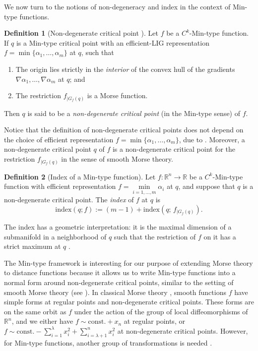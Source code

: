 \documentclass[11pt]{article}
\newcommand{\R}{\mathbb{R}}
\newcommand{\idx}{\mathrm{index}}
\newcommand{\grad}{\nabla}
\theoremstyle{plain}
\theoremstyle{definition}
\newtheorem{defi}{Definition}
\theoremstyle{remark}
\begin{document}
We now turn to the notions of non-degeneracy and index in the context of Min-type functions. 
	
\begin{defi}[Non-degenerate critical point \citep{gershkovich_morse_1997}]
	\label{def:non_degen_crit}
	Let $f$ be a $C^k$-Min-type function. If $q$ is a Min-type critical point with an efficient-LIG representation $f = \min \{ \alpha_1, \ldots, \alpha_m\}$ at $q$, such that 
	\begin{enumerate}
		\item The origin lies strictly in the \emph{interior} of the convex hull of the gradients $\grad \alpha_1, \ldots, \grad \alpha_m$ at $q$; and
		\item The restriction $f_{|G_f(q)}$ is a Morse function.
	\end{enumerate}
	Then $q$ is said to be a \emph{non-degenerate critical point} (in the Min-type sense) of $f$. 
\end{defi}
	
Notice that the definition of non-degenerate critical points does not depend on the choice of efficient representation $f = \min \{ \alpha_1, \ldots, \alpha_m\}$, due to .
Moreover, a non-degenerate critical point $q$ of $f$ is a non-degenerate critical point for the restriction $f_{|G_f(q)}$ in the sense of smooth Morse theory.

\begin{defi}[Index of a Min-type function]
	\label{def:index_min_type}
	Let $f : \R^n \to \R$ be a $C^k$-Min-type function with efficient representation $f = \min\limits_{i = 1,\ldots,m} \alpha_i$ at $q$,
	and suppose that $q$ is a non-degenerate critical point. The \emph{index} of $f$ at $q$ is
	\[ \idx(q;f) := (m-1) + \idx(q;\, f_{|G_f(q)}).\]
\end{defi}
The index has a geometric interpretation: it is the maximal dimension of a submanifold in a neighborhood of $q$ such that the restriction of $f$ on it has a strict maximum at $q$ \cite[Section 3.1, Proposition 3]{gershkovich_morse_1997}.

The Min-type framework is interesting for our purpose of extending Morse theory to distance functions because it allows us to write Min-type functions into a normal form around non-degenerate critical points, similar to the setting of smooth Morse theory (see ).
In classical Morse theory \citep{milnor_morse_1963}, smooth functions $f$ have simple forms at regular points and non-degenerate critical points. 
These forms are on the same orbit as $f$ under the action of the group of local diffeomorphisms of $\R^n$, and we either have $f \sim \mathrm{const.} + x_n$ at regular points, or $f \sim \mathrm{const.} - \sum_{i = 1}^{\lambda} x_i^2 + \sum_{i = \lambda + 1}^{n} x_i^2$ at non-degenerate critical points. However, for Min-type functions, another group of transformations is needed \citep{matov_singularities_1986, gershkovich_singularity_1997}.
\end{document}
